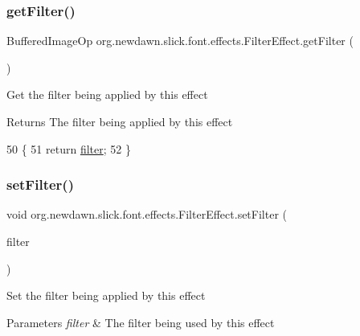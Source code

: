 \subsubsection{\texorpdfstring{get\+Filter()}{getFilter()}}
{\footnotesize\ttfamily Buffered\+Image\+Op org.\+newdawn.\+slick.\+font.\+effects.\+Filter\+Effect.\+get\+Filter (\begin{DoxyParamCaption}{ }\end{DoxyParamCaption})\hspace{0.3cm}{\ttfamily [inline]}}

Get the filter being applied by this effect

\begin{DoxyReturn}{Returns}
The filter being applied by this effect 
\end{DoxyReturn}

\begin{DoxyCode}
50                                        \{
51         \textcolor{keywordflow}{return} \mbox{\hyperlink{classorg_1_1newdawn_1_1slick_1_1font_1_1effects_1_1_filter_effect_aafe0a98e55b983f1b26e5ed235d254be}{filter}};
52     \}
\end{DoxyCode}
\mbox{\label{classorg_1_1newdawn_1_1slick_1_1font_1_1effects_1_1_filter_effect_a0ec0eb54fb67e32d69307f4823ee2edc}} 
\subsubsection{\texorpdfstring{set\+Filter()}{setFilter()}}
{\footnotesize\ttfamily void org.\+newdawn.\+slick.\+font.\+effects.\+Filter\+Effect.\+set\+Filter (\begin{DoxyParamCaption}\item[{Buffered\+Image\+Op}]{filter }\end{DoxyParamCaption})\hspace{0.3cm}{\ttfamily [inline]}}

Set the filter being applied by this effect


\begin{DoxyParams}{Parameters}
{\em filter} & The filter being used by this effect \\
\hline
\end{DoxyParams}

